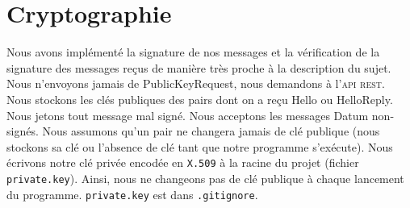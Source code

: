 \section{Cryptographie}
Nous avons implémenté la signature de nos messages et la vérification de la signature des messages reçus de manière très proche à la description du sujet. Nous n'envoyons jamais de PublicKeyRequest, nous demandons à l'\textsc{api} \textsc{rest}. Nous stockons les clés publiques des pairs dont on a reçu Hello ou HelloReply. Nous jetons tout message mal signé. Nous acceptons les messages Datum non-signés. Nous assumons qu'un pair ne changera jamais de clé publique (nous stockons sa clé ou l'absence de clé tant que notre programme s'exécute). Nous écrivons notre clé privée encodée en \texttt{X.509} à la racine du projet (fichier \texttt{private.key}). Ainsi, nous ne changeons pas de clé publique à chaque lancement du programme. \texttt{private.key} est dans \texttt{.gitignore}.
